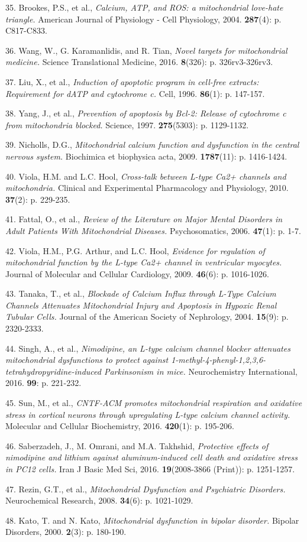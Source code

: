 \documentclass[]{article}
\begin{document}
35. Brookes, P.S., et al., \emph{Calcium, ATP, and ROS: a mitochondrial
love-hate triangle.} American Journal of Physiology - Cell Physiology,
2004. \textbf{287}(4): p. C817-C833.

36. Wang, W., G. Karamanlidis, and R. Tian, \emph{Novel targets for
mitochondrial medicine.} Science Translational Medicine, 2016.
\textbf{8}(326): p. 326rv3-326rv3.

37. Liu, X., et al., \emph{Induction of apoptotic program in cell-free
extracts: Requirement for dATP and cytochrome c.} Cell, 1996.
\textbf{86}(1): p. 147-157.

38. Yang, J., et al., \emph{Prevention of apoptosis by Bcl-2: Release of
cytochrome c from mitochondria blocked.} Science, 1997.
\textbf{275}(5303): p. 1129-1132.

39. Nicholls, D.G., \emph{Mitochondrial calcium function and dysfunction
in the central nervous system.} Biochimica et biophysica acta, 2009.
\textbf{1787}(11): p. 1416-1424.

40. Viola, H.M. and L.C. Hool, \emph{Cross-talk between L-type Ca2+
channels and mitochondria.} Clinical and Experimental Pharmacology and
Physiology, 2010. \textbf{37}(2): p. 229-235.

41. Fattal, O., et al., \emph{Review of the Literature on Major Mental
Disorders in Adult Patients With Mitochondrial Diseases.}
Psychosomatics, 2006. \textbf{47}(1): p. 1-7.

42. Viola, H.M., P.G. Arthur, and L.C. Hool, \emph{Evidence for
regulation of mitochondrial function by the L-type Ca2+ channel in
ventricular myocytes.} Journal of Molecular and Cellular Cardiology,
2009. \textbf{46}(6): p. 1016-1026.

43. Tanaka, T., et al., \emph{Blockade of Calcium Influx through L-Type
Calcium Channels Attenuates Mitochondrial Injury and Apoptosis in
Hypoxic Renal Tubular Cells.} Journal of the American Society of
Nephrology, 2004. \textbf{15}(9): p. 2320-2333.

44. Singh, A., et al., \emph{Nimodipine, an L-type calcium channel
blocker attenuates mitochondrial dysfunctions to protect against
1-methyl-4-phenyl-1,2,3,6-tetrahydropyridine-induced Parkinsonism in
mice.} Neurochemistry International, 2016. \textbf{99}: p. 221-232.

45. Sun, M., et al., \emph{CNTF-ACM promotes mitochondrial respiration
and oxidative stress in cortical neurons through upregulating L-type
calcium channel activity.} Molecular and Cellular Biochemistry, 2016.
\textbf{420}(1): p. 195-206.

46. Saberzadeh, J., M. Omrani, and M.A. Takhshid, \emph{Protective
effects of nimodipine and lithium against aluminum-induced cell death
and oxidative stress in PC12 cells.} Iran J Basic Med Sci, 2016.
\textbf{19}(2008-3866 (Print)): p. 1251-1257.

47. Rezin, G.T., et al., \emph{Mitochondrial Dysfunction and Psychiatric
Disorders.} Neurochemical Research, 2008. \textbf{34}(6): p. 1021-1029.

48. Kato, T. and N. Kato, \emph{Mitochondrial dysfunction in bipolar
disorder.} Bipolar Disorders, 2000. \textbf{2}(3): p. 180-190.
\end{document}
